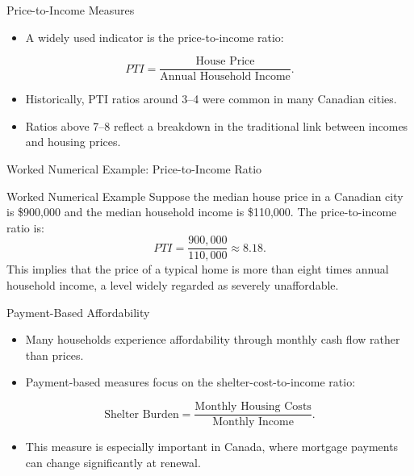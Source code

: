 \documentclass[aspectratio=169]{beamer}
\begin{document}
\begin{frame}{Price-to-Income Measures}
\transfade
\begin{itemize}
  \item A widely used indicator is the price-to-income ratio:
\end{itemize}

\vspace{0.2cm}
\[
PTI = \frac{\text{House Price}}{\text{Annual Household Income}}.
\]

\vspace{0.2cm}
\begin{itemize}
  \item Historically, PTI ratios around 3--4 were common in many Canadian cities.
  \item Ratios above 7--8 reflect a breakdown in the traditional link between incomes and housing prices.
\end{itemize}
\end{frame}

\begin{frame}{Worked Numerical Example: Price-to-Income Ratio}
\transfade
\begin{block}{Worked Numerical Example}
Suppose the median house price in a Canadian city is \$900{,}000 and the median household income is \$110{,}000. The price-to-income ratio is:
\[
PTI = \frac{900{,}000}{110{,}000} \approx 8.18.
\]
This implies that the price of a typical home is more than eight times annual household income, a level widely regarded as severely unaffordable.
\end{block}
\end{frame}

\begin{frame}{Payment-Based Affordability}
\transfade
\begin{itemize}
  \item Many households experience affordability through monthly cash flow rather than prices.
  \item Payment-based measures focus on the shelter-cost-to-income ratio:
\end{itemize}

\vspace{0.2cm}
\[
\text{Shelter Burden} = \frac{\text{Monthly Housing Costs}}{\text{Monthly Income}}.
\]

\vspace{0.2cm}
\begin{itemize}
  \item This measure is especially important in Canada, where mortgage payments can change significantly at renewal.
\end{itemize}
\end{frame}
\end{document}
